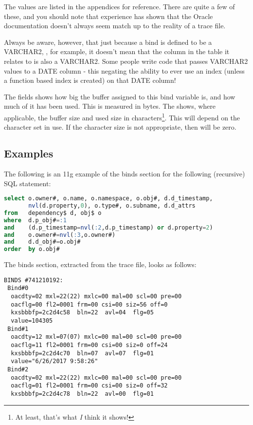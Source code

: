 The  values are listed in the appendices for reference. There are quite a few of these, and you should note that experience has shown that the Oracle documentation doesn't always seem match up to the reality of a trace file.

Always be aware, however, that just because a bind is defined to be a VARCHAR2, , for example, it doesn't mean that the column in the table it relates to is also a VARCHAR2. Some people write code that passes VARCHAR2 values to a DATE column - this negating the ability to ever use an index (unless a function based index is created) on that DATE column!

The  fields shows how big the buffer assigned to this bind variable is, and how much of it has been used. This is measured in bytes. The  shows, where applicable, the buffer size and used size in characters\footnote{At least, that's what \emph{I} think it   shows!}. This will depend on the character set in use. If the character size is not appropriate, then  will be zero.

\subsection{Examples}\label{examples}

The following is an 11g example of the binds section for the following (recursive) SQL statement:

\begin{lstlisting}[language=SQL,caption={Example of Recursive SQL Statement}]
select o.owner#, o.name, o.namespace, o.obj#, d.d_timestamp, 
       nvl(d.property,0), o.type#, o.subname, d.d_attrs  
from   dependency$ d, obj$ o 
where  d.p_obj#=:1 
and    (d.p_timestamp=nvl(:2,d.p_timestamp) or d.property=2) 
and    o.owner#=nvl(:3,o.owner#) 
and    d.d_obj#=o.obj# 
order  by o.obj#
\end{lstlisting}

The binds section, extracted from the trace file, looks as follows:

\begin{lstlisting}[numbers=none,caption={Binds Lines}]
BINDS #741210192:
 Bind#0
  oacdty=02 mxl=22(22) mxlc=00 mal=00 scl=00 pre=00
  oacflg=00 fl2=0001 frm=00 csi=00 siz=56 off=0
  kxsbbbfp=2c2d4c58  bln=22  avl=04  flg=05
  value=104305
 Bind#1
  oacdty=12 mxl=07(07) mxlc=00 mal=00 scl=00 pre=00
  oacflg=11 fl2=0001 frm=00 csi=00 siz=0 off=24
  kxsbbbfp=2c2d4c70  bln=07  avl=07  flg=01
  value="6/26/2017 9:58:26"
 Bind#2
  oacdty=02 mxl=22(22) mxlc=00 mal=00 scl=00 pre=00
  oacflg=01 fl2=0001 frm=00 csi=00 siz=0 off=32
  kxsbbbfp=2c2d4c78  bln=22  avl=00  flg=01
\end{lstlisting}

